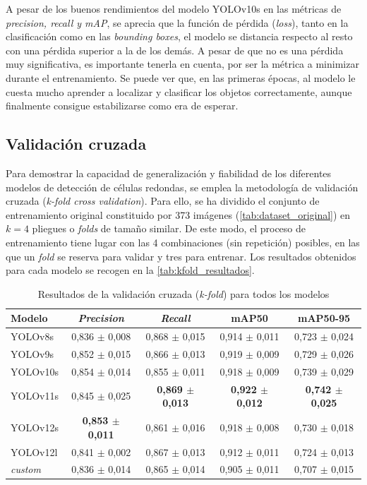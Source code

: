 \documentclass[12pt,a4paper,onecolumn,oneside]{report}
\begin{document}
A pesar de los buenos rendimientos del modelo YOLOv10s en las métricas de \textit{precision, recall y mAP}, se aprecia que la función de pérdida (\textit{loss}), tanto en la clasificación como en las \textit{bounding boxes},
el modelo se distancia respecto al resto con una pérdida superior a la de los demás. A pesar de que no es una pérdida muy significativa, es importante tenerla en cuenta, por ser la métrica a minimizar durante el entrenamiento.
Se puede ver que, en las primeras épocas, al modelo le cuesta mucho aprender a localizar y clasificar los objetos correctamente, aunque finalmente consigue estabilizarse como era de esperar.

\subsection{Validación cruzada}
\label{sec:Validación cruzada}

Para demostrar la capacidad de generalización y fiabilidad de los diferentes modelos de detección de células redondas, se emplea la metodología
de validación cruzada (\textit{k-fold cross validation}). Para ello, se ha dividido el conjunto de entrenamiento original constituido por 373 imágenes (\autoref{tab:dataset_original}) en $k=4$ pliegues o \textit{folds} de tamaño similar.
De este modo, el proceso de entrenamiento tiene lugar con las 4 combinaciones (sin repetición) posibles, en las que un \textit{fold} se reserva para validar y tres para entrenar. Los resultados obtenidos para cada modelo se recogen en la \autoref{tab:kfold_resultados}.

\begin{table}[htbp]
\caption{Resultados de la validación cruzada (\textit{k-fold}) para todos los modelos}
\label{tab:kfold_resultados}
\centering
\begin{tabular}{lcccc}
\toprule
\textbf{Modelo} & \textbf{\textit{Precision}} & \textbf{\textit{Recall}} & \textbf{mAP50} & \textbf{mAP50-95} \\
\midrule
YOLOv8s  & 0,836 $\pm$ 0,008 & 0,868 $\pm$ 0,015 & 0,914 $\pm$ 0,011 & 0,723 $\pm$ 0,024 \\
YOLOv9s  & 0,852 $\pm$ 0,015 & 0,866 $\pm$ 0,013 & 0,919 $\pm$ 0,009 & 0,729 $\pm$ 0,026 \\
YOLOv10s & 0,854 $\pm$ 0,014 & 0,855 $\pm$ 0,011 & 0,918 $\pm$ 0,009 & 0,739 $\pm$ 0,029 \\
YOLOv11s & 0,845 $\pm$ 0,025 & \textbf{0,869 $\pm$ 0,013} & \textbf{0,922 $\pm$ 0,012} & \textbf{0,742 $\pm$ 0,025} \\
YOLOv12s & \textbf{0,853 $\pm$ 0,011} & 0,861 $\pm$ 0,016 & 0,918 $\pm$ 0,008 & 0,730 $\pm$ 0,018 \\
YOLOv12l & 0,841 $\pm$ 0,002 & 0,867 $\pm$ 0,013 & 0,912 $\pm$ 0,011 & 0,724 $\pm$ 0,013 \\
\textit{custom}   & 0,836 $\pm$ 0,014 & 0,865 $\pm$ 0,014 & 0,905 $\pm$ 0,011 & 0,707 $\pm$ 0,015 \\
\bottomrule
\end{tabular}
\end{table}
\end{document}
